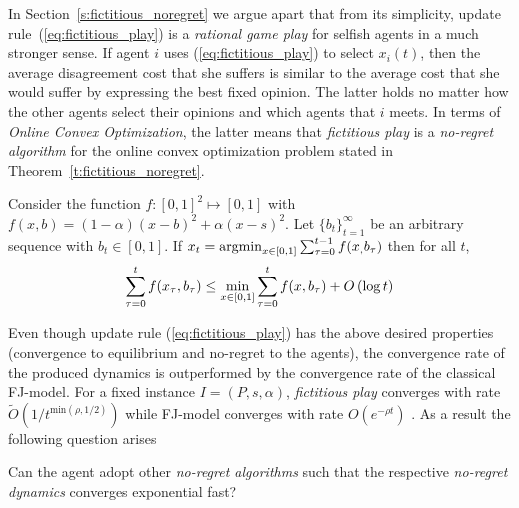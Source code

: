 \noindent In Section~\ref{s:fictitious_noregret} we argue apart that from its simplicity, update 
rule~(\ref{eq:fictitious_play}) is a \emph{rational game play} 
for selfish agents in a much stronger sense. 
If agent $i$ uses (\ref{eq:fictitious_play})
to select $x_i(t)$, then the average disagreement cost that she suffers is similar to the average cost that she would suffer 
by expressing the best fixed opinion. The latter holds no matter how the other agents select
their opinions and which agents that $i$ meets.
In terms of \emph{Online Convex Optimization}, the latter
means that \emph{fictitious play} is a \emph{no-regret algorithm} for the online 
convex optimization problem stated in Theorem~\ref{t:fictitious_noregret}.
\begin{theorem}\label{t:fictitious_noregret}
Consider the function $f:[0,1]^2 \mapsto [0,1]$ with $f(x,b) = (1-\alpha)(x-b)^2 + \alpha(x-s)^2$.
Let $\{b_t\}_{t=1}^\infty$ be an arbitrary sequence with $b_t \in [0,1]$. If $x_t = \operatorname*{argmin}_{x \in [0,1]}\sum_{\tau=0}^{t-1}f(x_,b_\tau)$
then for all $t$, 
\[\sum_{\tau=0}^{t}f(x_\tau,b_\tau) \leq \min_{x \in [0,1]}\sum_{\tau=0}^tf(x,b_\tau) + O\left(\log t\right)\]
\end{theorem}

Even though update rule (\ref{eq:fictitious_play}) has the above
desired properties (convergence to equilibrium and no-regret to the agents), 
the convergence rate of the produced dynamics is outperformed by
the convergence rate of the classical FJ-model. For 
a fixed instance $I=(P,s,\alpha)$, \emph{fictitious play} converges with rate
$\widetilde{O}(1/t^{\text{min}(\rho,1/2)})$ while FJ-model
converges with rate $O(e^{-\rho t})$ \cite{GS14}.
As a result the following question arises
\begin{question}
Can the agent adopt other \emph{no-regret algorithms} such that the respective \emph{no-regret
dynamics} converges exponential fast?
\end{question}

